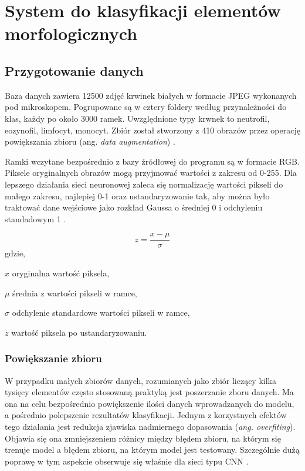 \chapter{System do klasyfikacji elementów morfologicznych}
\label{cha:system_do_klasyfikacji_elementow_morfologicznych}

\section{Przygotowanie danych}
\label{przygotowanie_danych}

Baza danych zawiera 12500 zdjęć krwinek białych w formacie JPEG wykonanych pod mikroskopem. Pogrupowane są w cztery foldery według przynależności do klas, każdy po około 3000 ramek. Uwzględnione typy krwnek to neutrofil, eozynofil, limfocyt, monocyt. Zbiór został stworzony z 410 obrazów przez operację powiększania zbioru (ang. \textit{data augmentation}) \cite{database_kaggle}.

Ramki wczytane bezpośrednio z bazy źródłowej do programu są w formacie RGB. Piksele oryginalnych obrazów mogą przyjmować wartości z zakresu od 0-255. Dla lepszego działania sieci neuronowej zaleca się normalizację wartości pikseli do małego zakresu, najlepiej 0-1 oraz ustandaryzowanie tak, aby można było traktować dane wejściowe jako rozkład Gaussa o średniej 0 i odchyleniu standadowym 1 \cite{standarisation}.

\begin{equation}
z =  \frac{x - \mu}{\sigma} 
\end{equation}
gdzie,
\begin{eqwhere}[2cm]
	\item[$x$] oryginalna wartość piksela,
	\item[$\mu$] średnia z wartości pikseli w ramce,
	\item[$\sigma$] odchylenie standardowe wartości pikseli w ramce,
	\item[$z$] wartość piksela po ustandaryzowaniu.
\end{eqwhere}

\subsection{Powiększanie zbioru}
W przypadku małych zbiorów danych, rozumianych jako zbiór liczący kilka tysięcy elementów często stosowaną praktyką jest poszerzanie zboru danych. Ma ona na celu bezpośrednio powiększenie ilości danych wprowadzanych do modelu, a pośrednio polepszenie rezultatów klasyfikacji. Jednym z korzystnych efektów tego działania jest redukcja zjawiska nadmiernego dopasowania (\textit{ang. overfiting}). Objawia się ona zmniejszeniem różnicy między błędem zbioru, na którym się trenuje model a błędem zbioru, na którym model jest testowany. Szczególnie dużą poprawę w tym aspekcie obserwuje się właśnie dla sieci typu CNN \cite{Wong2016UnderstandingDA}.

